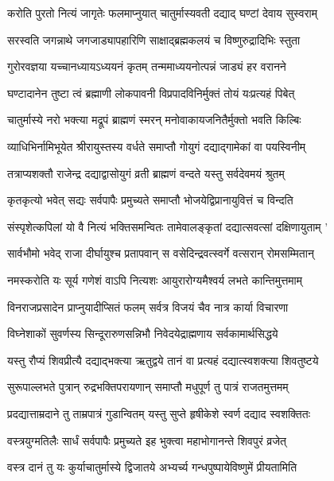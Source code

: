 \twolineshloka
{करोति पुरतो नित्यं जागृतेः फलमाप्नुयात्}
{चातुर्मास्यवती दद्याद् घण्टां देवाय सुस्वराम्} %

\twolineshloka
{सरस्वति जगन्नाथे जगजाड्यापहारिणि}
{साक्षाद्ब्रह्मकलयं च विष्णुरुद्रादिभिः स्तुता} %

\twolineshloka
{गुरोरवज्ञया यच्चानध्यायऽध्ययनं कृतम्}
{तन्ममाध्ययनोत्पन्नं जाड्यं हर वरानने} %

\twolineshloka
{घण्टादानेन तुष्टा त्वं ब्रह्माणी लोकपावनी}
{विप्रपादविनिर्मुक्तं तोयं यःप्रत्यहं पिबेत्} %

\twolineshloka
{चातुर्मास्ये नरो भक्त्या मद्रूपं ब्राह्मणं स्मरन्}
{मनोवाकायजनितैर्मुक्तो भवति किल्बिः} %

\twolineshloka
{व्याधिभिर्नामिभूयेत श्रीरायुस्तस्य वर्धते}
{समाप्तौ गोयुगं दद्याद्गामेकां वा पयस्विनीम्} %

\twolineshloka
{तत्राप्यशक्तौ राजेन्द्र दद्याद्वासोयुगं व्रती}
{ब्राह्मणं वन्दते यस्तु सर्वदेवमयं श्रुतम्} %

\twolineshloka
{कृतकृत्यो भवेत् सद्यः सर्वपापैः प्रमुच्यते}
{समाप्तौ भोजयेद्विप्रानायुवित्तं च विन्दति} %

\twolineshloka
{संस्पृशेत्कपिलां यो वै नित्यं भक्तिसमन्वितः}
{तामेवालङ्कृतां दद्यात्सवत्सां दक्षिणायुताम् '} %

\twolineshloka
{सार्वभौमो भवेद् राजा दीर्घायुश्च प्रतापवान्}
{स वसेदिन्द्रवत्स्वर्गे वत्सरान् रोमसम्मितान्} %

\twolineshloka
{नमस्करोति यः सूर्य गणेशं वाऽपि नित्यशः}
{आयुरारोग्यमैश्वर्य लभते कान्तिमुत्तमाम्} %

\twolineshloka
{विनराजप्रसादेन प्राप्नुयादीप्सितं फलम्}
{सर्वत्र विजयं चैव नात्र कार्या विचारणा} %

\twolineshloka
{विघ्नेशाकों सुवर्णस्य सिन्दूरारुणसन्निभौ}
{निवेदयेद्राह्मणाय सर्वकामार्थसिद्धये} %

\twolineshloka
{यस्तु रौप्यं शिवप्रीत्यै दद्याद्भक्त्या ऋतुद्वये}
{तानं वा प्रत्यहं दद्यात्स्वशक्त्या शिवतुष्टये} %

\twolineshloka
{सुरूपाल्लभते पुत्रान् रुद्रभक्तिपरायणान्}
{समाप्तौ मधुपूर्ण तु पात्रं राजतमुत्तमम्} %

\twolineshloka
{प्रदद्यात्ताम्रदाने तु ताम्रपात्रं गुडान्वितम्}
{यस्तु सुप्ते हृषीकेशे स्वर्ण दद्याद स्वशक्तितः} %

\twolineshloka
{वस्त्रयुग्मतिलैः सार्धं सर्वपापैः प्रमुच्यते}
{इह भुक्त्वा महाभोगानन्ते शिवपुरं व्रजेत्} %

\twolineshloka
{वस्त्र दानं तु यः कुर्याचातुर्मास्ये द्विजातये}
{अभ्यर्च्य गन्धपुष्पायेविष्णुमें प्रीयतामिति} %

